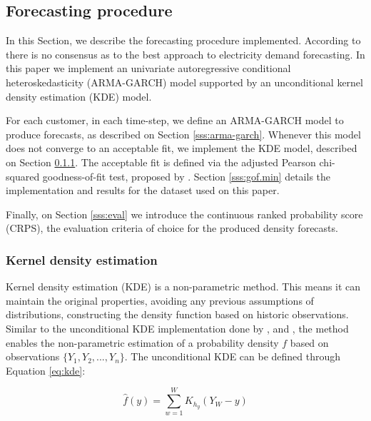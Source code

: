 \documentclass[preprint,3p,12pt,authoryear]{elsarticle}
\begin{document}
\subsection{Forecasting procedure}
\label{ss:fcst}
In this Section, we describe the forecasting procedure implemented.
According to \citet{TAYLOR200357} there is no consensus as to the best approach to electricity demand forecasting.
In this paper we implement an univariate autoregressive conditional heteroskedasticity (ARMA-GARCH) model supported by an unconditional kernel density estimation (KDE) model.

For each customer, in each time-step, we define an ARMA-GARCH model to produce forecasts, as described on Section \ref{sss:arma-garch}.
Whenever this model does not converge to an acceptable fit, we implement the KDE model, described on Section \ref{sss:kde}.
The acceptable fit is defined via the adjusted Pearson chi-squared goodness-of-fit test, proposed by \citet{vlaarpalm_gof}.
Section \ref{sss:gof.min} details the implementation and results for the dataset used on this paper.

Finally, on Section \ref{sss:eval} we introduce the continuous ranked probability score (CRPS), the evaluation criteria of choice for the produced density forecasts.

\subsubsection{Kernel density estimation}
\label{sss:kde}

Kernel density estimation (KDE) is a non-parametric method.
This means it can maintain the original properties, avoiding any previous assumptions of distributions, constructing the density function based on historic observations.
Similar to the unconditional KDE implementation done by \citet{Arora201647}, \citet{Jeon2016991} and \citet{Taylor2015370}, the method enables the non-parametric estimation of a probability density \(f\) based on observations \(\{Y_{1},Y_{2},...,Y_{n}\}\).
The unconditional KDE can be defined through Equation \ref{eq:kde}:

\begin{equation}
   \hat f(y) = \sum_{w=1}^{W} K_{h_y} (Y_W - y) %
   \label{eq:kde}
\end{equation}
\end{document}
